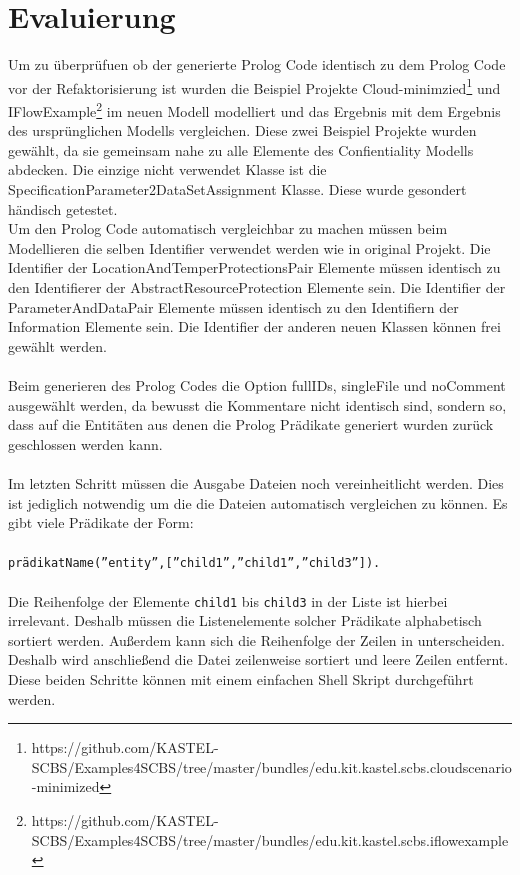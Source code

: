 \documentclass[twoside, ngerman]{sdqseminar}
\begin{document}
\section{Evaluierung}
Um zu überprüfuen ob der generierte Prolog Code identisch zu dem Prolog Code vor der Refaktorisierung ist wurden die Beispiel Projekte Cloud-minimzied\footnote{https://github.com/KASTEL-SCBS/Examples4SCBS/tree/master/bundles/edu.kit.kastel.scbs.cloudscenario-minimized} und IFlowExample\footnote{https://github.com/KASTEL-SCBS/Examples4SCBS/tree/master/bundles/edu.kit.kastel.scbs.iflowexample} im neuen Modell modelliert und das Ergebnis mit dem Ergebnis des ursprünglichen Modells vergleichen. Diese zwei Beispiel Projekte wurden gewählt, da sie gemeinsam nahe zu alle Elemente des Confientiality Modells abdecken. Die einzige nicht verwendet Klasse ist die SpecificationParameter2DataSetAssignment Klasse. Diese wurde gesondert händisch getestet. \\
%
Um den Prolog Code automatisch vergleichbar zu machen müssen beim Modellieren die selben Identifier verwendet werden wie in original Projekt. Die Identifier der LocationAndTemperProtectionsPair Elemente müssen identisch zu den Identifierer der AbstractResourceProtection Elemente sein. Die Identifier der ParameterAndDataPair Elemente müssen identisch zu den Identifiern der Information Elemente sein. Die Identifier der anderen neuen Klassen können frei gewählt werden. \\ \\
Beim generieren des Prolog Codes die Option fullIDs, singleFile und noComment ausgewählt werden, da bewusst die Kommentare nicht identisch sind, sondern so, dass auf die Entitäten aus denen die Prolog Prädikate generiert wurden zurück geschlossen werden kann. \\ \\
Im letzten Schritt müssen die Ausgabe Dateien noch vereinheitlicht werden. Dies ist jediglich notwendig um die die Dateien automatisch vergleichen zu können. Es gibt viele Prädikate der Form: \\ \\ \texttt{prädikatName(''entity'',[''child1'',''child1'',''child3'']).} \\ \\ Die Reihenfolge der Elemente \texttt{child1} bis \texttt{child3} in der Liste ist hierbei irrelevant. Deshalb müssen die Listenelemente solcher Prädikate alphabetisch sortiert werden. Außerdem kann sich die Reihenfolge der Zeilen in unterscheiden. Deshalb wird anschließend die Datei zeilenweise sortiert und leere Zeilen entfernt. Diese beiden Schritte können mit einem einfachen Shell Skript durchgeführt werden. 
\end{document}

